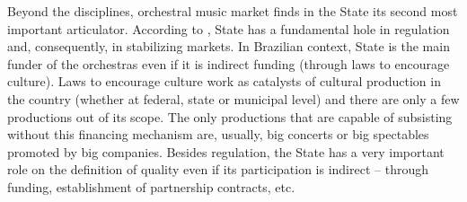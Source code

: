 \documentclass[a4paper, 12pt, openright, oneside, german, french, brazil, english]{abntex2}
\begin{document}
	Beyond the disciplines, orchestral music market finds in the State its second most important articulator. According to , State has a fundamental hole in regulation and, consequently, in stabilizing markets. In Brazilian context, State is the main funder of the orchestras even if it is indirect funding (through laws to encourage culture). Laws to encourage culture work as catalysts of cultural production in the country (whether at federal, state or municipal level) and there are only a few productions out of its scope. The only productions that are capable of subsisting without this financing mechanism are, usually, big concerts or big spectables promoted by big companies. Besides regulation, the State has a very important role on the definition of quality even if its participation is indirect -- through funding, establishment of partnership contracts, etc.
	
	
\end{document}
